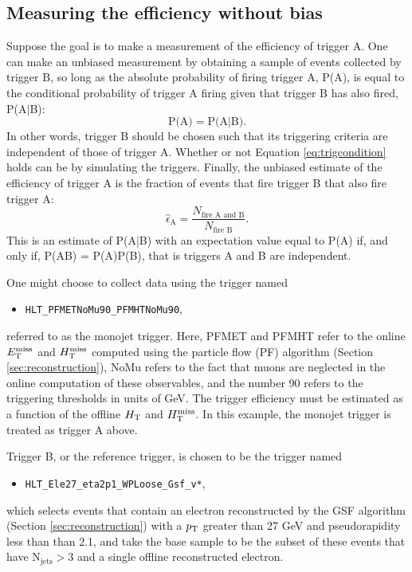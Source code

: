 \subsection{Measuring the efficiency without bias}
Suppose the goal is to make a measurement of the efficiency of trigger A. One can make an unbiased measurement by obtaining a sample of events collected by trigger B, so long as the absolute probability of firing trigger A, P(A), is equal to the conditional probability of trigger A firing given that trigger B has also fired, P(A$|$B):
\begin{equation}
\text{P(A)} = \text{P(A|B)}.
\label{eq:trigcondition}
\end{equation}
In other words, trigger B should be chosen such that its triggering criteria are independent of those of trigger A. Whether or not Equation \ref{eq:trigcondition} holds can be by simulating the triggers. Finally, the unbiased estimate of the efficiency of trigger A is the fraction of events that fire trigger B that also fire trigger A:
\begin{equation}
\hat{\epsilon}_{\text{A}} = \frac{N_{\text{fire A and B}}}{N_{\text{fire B}}}.
\label{eq:trigeff}
\end{equation}
This is an estimate of P(A|B) with an expectation value equal to P(A) if, and only if, P(AB) = P(A)P(B), that is triggers A and B are independent.

One might choose to collect data using the trigger named
\begin{itemize}
  \item \texttt{HLT\_PFMETNoMu90\_PFMHTNoMu90},
\end{itemize}
referred to as the monojet trigger. Here, PFMET and PFMHT refer to the online $E_{\text{T}}^{\rm miss}$ and $H_{\text{T}}^{\rm miss}$ computed using the particle flow (PF) algorithm (Section \ref{sec:reconstruction}), NoMu refers to the fact that muons are neglected in the online computation of these observables, and the number 90 refers to the triggering thresholds in units of GeV. The trigger efficiency must be estimated as a function of the offline $H_{\rm T}$ and $H_{\text{T}}^{\rm miss}$. In this example, the monojet trigger is treated as trigger A above. 

Trigger B, or the reference trigger, is chosen to be the trigger named
\begin{itemize}
  \item \texttt{HLT\_Ele27\_eta2p1\_WPLoose\_Gsf\_v*}, 
\end{itemize}
which selects events that contain an electron reconstructed by the GSF algorithm (Section \ref{sec:reconstruction}) with a $p_{\text{T}}$ greater than 27 GeV and pseudorapidity less than than 2.1,
and take the base sample to be the subset of these events that have $\text{N}_{\text{jets}}>3$ and a single offline reconstructed electron.  

